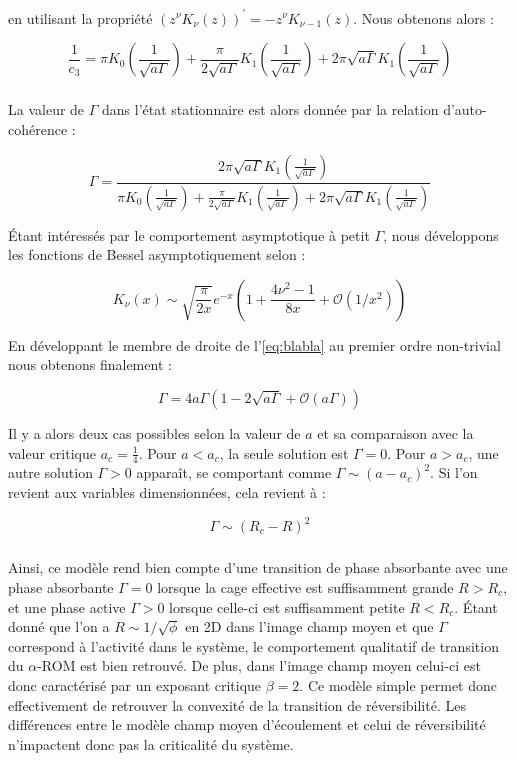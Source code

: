 \noindent en utilisant la propriété $(z^\nu K_\nu (z))^\prime = -z^\nu K_{\nu-1}(z)$. Nous obtenons alors :

\begin{equation}
\frac{1}{c_3} = \pi K_0\left( \frac{1}{\sqrt{a\Gamma}} \right) + \frac{\pi}{2\sqrt{a\Gamma}}K_1\left( \frac{1}{\sqrt{a\Gamma}} \right)+2\pi \sqrt{a\Gamma}K_1\left( \frac{1}{\sqrt{a\Gamma}} \right)
\end{equation}

\subparagraph{}La valeur de $\Gamma$ dans l'état stationnaire est alors donnée par la relation d'auto-cohérence :

\begin{equation}
	\Gamma = \frac{2\pi \sqrt{a\Gamma}K_1\left( \frac{1}{\sqrt{a\Gamma}} \right)}{\pi K_0\left( \frac{1}{\sqrt{a\Gamma}} \right) + \frac{\pi}{2\sqrt{a\Gamma}}K_1\left( \frac{1}{\sqrt{a\Gamma}} \right)+2\pi \sqrt{a\Gamma}K_1\left( \frac{1}{\sqrt{a\Gamma}} \right)}
	\label{eq:blabla}
\end{equation}

\noindent Étant intéressés par le comportement asymptotique à petit $\Gamma$, nous développons les fonctions de Bessel asymptotiquement selon \cite{abramowitz_handbook_1965} :

\begin{equation}
	K_\nu (x) \sim \sqrt{\frac{\pi}{2x}}e^{-x}\left( 1+\frac{4\nu^2-1}{8x}+\mathcal{O}(1/x^2) \right)
\end{equation}

\noindent En développant le membre de droite de l'\autoref{eq:blabla} au premier ordre non-trivial nous obtenons finalement :

\begin{equation}
	\Gamma = 4a\Gamma\left( 1-2\sqrt{a\Gamma}+\mathcal{O}(a\Gamma) \right)
\end{equation}

\noindent Il y a alors deux cas possibles selon la valeur de $a$ et sa comparaison avec la valeur critique $a_c = \frac{1}{4}$. Pour $a<a_c$, la seule solution est $\Gamma = 0$. Pour $a>a_c$, une autre solution $\Gamma > 0$ apparaît, se comportant comme $\Gamma \sim (a-a_c)^2$. Si l'on revient aux variables dimensionnées, cela revient à :

\begin{equation}
	\Gamma \sim (R_c-R)^2
	\label{eq:resolhl2d}
\end{equation}

\subparagraph{}Ainsi, ce modèle rend bien compte d'une transition de phase absorbante avec une phase absorbante $\Gamma = 0$ lorsque la cage effective est suffisamment grande $R>R_c$, et une phase active $\Gamma >0$ lorsque celle-ci est suffisamment petite $R<R_c$. Étant donné que l'on a $R\sim 1/\sqrt{\phi}$ en 2D dans l'image champ moyen et que $\Gamma$ correspond à l'activité dans le système, le comportement qualitatif de transition du $\alpha$-ROM est bien retrouvé. De plus, dans l'image champ moyen celui-ci est donc caractérisé par un exposant critique $\beta = 2$. Ce modèle simple permet donc effectivement de retrouver la convexité de la transition de réversibilité. Les différences entre le modèle champ moyen d'écoulement et celui de réversibilité n'impactent donc pas la criticalité du système.

